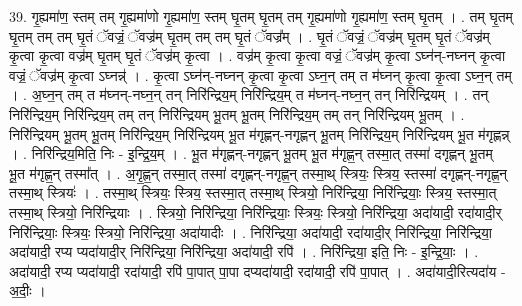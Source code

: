 \documentclass[17pt]{extarticle}
\begin{document}
39. गृ॒ह्यमा॑ण॒ स्तम् तम् गृ॒ह्यमा॑णो गृ॒ह्यमा॑ण॒ स्तम् घृ॒तम् घृ॒तम् तम् गृ॒ह्यमा॑णो गृ॒ह्यमा॑ण॒ स्तम् घृ॒तम् । . तम् घृ॒तम् घृ॒तम् तम् तम् घृ॒तं ॅवज्रं॒ ॅवज्र॑म् घृ॒तम् तम् तम् घृ॒तं ॅवज्र᳚म् । . घृ॒तं ॅवज्रं॒ ॅवज्र॑म् घृ॒तम् घृ॒तं ॅवज्र॑म् कृ॒त्वा कृ॒त्वा वज्र॑म् घृ॒तम् घृ॒तं ॅवज्र॑म् कृ॒त्वा । . वज्र॑म् कृ॒त्वा कृ॒त्वा वज्रं॒ ॅवज्र॑म् कृ॒त्वा ऽघ्न॑न्-नघ्नन् कृ॒त्वा वज्रं॒ ॅवज्र॑म् कृ॒त्वा ऽघ्नन्न्॑ । . कृ॒त्वा ऽघ्न॑न्-नघ्नन् कृ॒त्वा कृ॒त्वा ऽघ्न॒न् तम् त म॑घ्नन् कृ॒त्वा कृ॒त्वा ऽघ्न॒न् तम् । . अ॒घ्न॒न् तम् त म॑घ्नन्-नघ्न॒न् तन् निरि॑न्द्रिय॒म् निरि॑न्द्रिय॒म् त म॑घ्नन्-नघ्न॒न् तन् निरि॑न्द्रियम् । . तन् निरि॑न्द्रिय॒म् निरि॑न्द्रिय॒म् तम् तन् निरि॑न्द्रियम् भू॒तम् भू॒तम् निरि॑न्द्रिय॒म् तम् तन् निरि॑न्द्रियम् भू॒तम् । . निरि॑न्द्रियम् भू॒तम् भू॒तम् निरि॑न्द्रिय॒म् निरि॑न्द्रियम् भू॒त म॑गृह्णन्-नगृह्णन् भू॒तम् निरि॑न्द्रिय॒म् निरि॑न्द्रियम् भू॒त म॑गृह्णन्न् । . निरि॑न्द्रिय॒मिति॒ निः - इ॒न्द्रि॒य॒म् । . भू॒त म॑गृह्णन्-नगृह्णन् भू॒तम् भू॒त म॑गृह्ण॒न् तस्मा॒त् तस्मा॑ दगृह्णन् भू॒तम् भू॒त म॑गृह्ण॒न् तस्मा᳚त् । . अ॒गृ॒ह्ण॒न् तस्मा॒त् तस्मा॑ दगृह्णन्-नगृह्ण॒न् तस्मा॒थ् स्त्रियः॒ स्त्रिय॒ स्तस्मा॑ दगृह्णन्-नगृह्ण॒न् तस्मा॒थ् स्त्रियः॑ । . तस्मा॒थ् स्त्रियः॒ स्त्रिय॒ स्तस्मा॒त् तस्मा॒थ् स्त्रियो॒ निरि॑न्द्रिया॒ निरि॑न्द्रियाः॒ स्त्रिय॒ स्तस्मा॒त् तस्मा॒थ् स्त्रियो॒ निरि॑न्द्रियाः । . स्त्रियो॒ निरि॑न्द्रिया॒ निरि॑न्द्रियाः॒ स्त्रियः॒ स्त्रियो॒ निरि॑न्द्रिया॒ अदा॑यादी॒ रदा॑यादी॒र् निरि॑न्द्रियाः॒ स्त्रियः॒ स्त्रियो॒ निरि॑न्द्रिया॒ अदा॑यादीः । . निरि॑न्द्रिया॒ अदा॑यादी॒ रदा॑यादी॒र् निरि॑न्द्रिया॒ निरि॑न्द्रिया॒ अदा॑यादी॒ रप्य प्यदा॑यादी॒र् निरि॑न्द्रिया॒ निरि॑न्द्रिया॒ अदा॑यादी॒ रपि॑ । . निरि॑न्द्रिया॒ इति॒ निः - इ॒न्द्रि॒याः॒ । . अदा॑यादी॒ रप्य प्यदा॑यादी॒ रदा॑यादी॒ रपि॑ पा॒पात् पा॒पा दप्यदा॑यादी॒ रदा॑यादी॒ रपि॑ पा॒पात् । . अदा॑यादी॒रित्यदा॑य - अ॒दीः॒ । \newline
\end{document}
